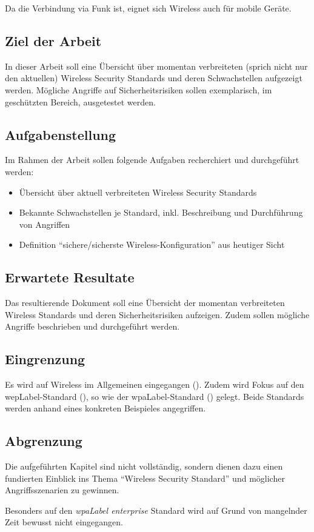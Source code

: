 Da die Verbindung via Funk ist, eignet sich Wireless auch für mobile Geräte.

\subsection{Ziel der Arbeit}
In dieser Arbeit soll eine Übersicht über momentan verbreiteten (sprich nicht nur den aktuellen) Wireless Security Standards und deren Schwachstellen aufgezeigt werden.
Mögliche Angriffe auf Sicherheitsrisiken sollen exemplarisch, im geschützten Bereich, ausgetestet werden.

\subsection{Aufgabenstellung}
Im Rahmen der Arbeit sollen folgende Aufgaben recherchiert und durchgeführt werden:
\begin{itemize}
	\item Übersicht über aktuell verbreiteten Wireless Security Standards
	\item Bekannte Schwachstellen je Standard, inkl. Beschreibung und Durchführung von Angriffen
	\item Definition "`sichere/sicherste Wireless-Konfiguration"' aus heutiger Sicht
\end{itemize}

\subsection{Erwartete Resultate}
Das resultierende Dokument soll eine Übersicht der momentan verbreiteten Wireless Standards und deren Sicherheitsrisiken aufzeigen.
Zudem sollen mögliche Angriffe beschrieben und durchgeführt werden.

\subsection{Eingrenzung}
Es wird auf Wireless im Allgemeinen eingegangen ().
Zudem wird Fokus auf den \gls{wepLabel}-Standard (), so wie der \gls{wpaLabel}-Standard () gelegt. Beide Standards werden anhand eines konkreten Beispieles angegriffen.

\subsection{Abgrenzung}
Die aufgeführten Kapitel sind nicht vollständig, sondern dienen dazu einen fundierten Einblick ins Thema "`Wireless Security Standard"' und möglicher Angriffsszenarien zu gewinnen.

Besonders auf den \textit{\gls{wpaLabel} enterprise} Standard wird auf Grund von mangelnder Zeit bewusst nicht eingegangen.
